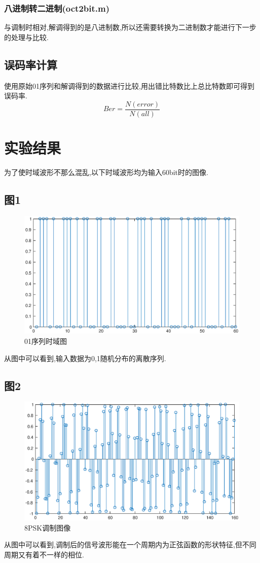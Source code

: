 \documentclass[UTF8]{article}
\begin{document}
\begin{CJK}{UTF8}{gkai}
\subsubsection{八进制转二进制(oct2bit.m)}
与调制时相对,解调得到的是八进制数,所以还需要转换为二进制数才能进行下一步的处理与比较.
\subsection{误码率计算}
使用原始01序列和解调得到的数据进行比较,用出错比特数比上总比特数即可得到误码率.
$$Ber=\frac{N(error)}{N(all)}$$
\section{实验结果}
为了使时域波形不那么混乱,以下时域波形均为输入60bit时的图像.
\subsection{图1}
\begin{figure}[H]
    \centering
    \includegraphics[scale=0.7]{plot1.eps}
    \caption{01序列时域图}
    \label{blocks}
\end{figure}
从图中可以看到,输入数据为0,1随机分布的离散序列.
\subsection{图2}
\begin{figure}[H]
    \centering
    \includegraphics[scale=0.7]{plot2.eps}
    \caption{8PSK调制图像}
    \label{blocks}
\end{figure}
从图中可以看到,调制后的信号波形能在一个周期内为正弦函数的形状特征,但不同周期又有着不一样的相位.

\end{CJK}
\end{document}
